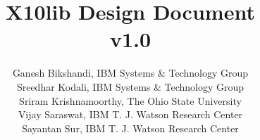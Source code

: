 \documentclass{article}
\def\Xtenlib{{\sf X10lib}}
\begin{document}
\title{\Xtenlib{} Design Document \\ v1.0}
\author{Ganesh Bikshandi, IBM Systems \& Technology Group\\
Sreedhar Kodali, IBM Systems \& Technology Group\\
Sriram Krishnamoorthy, The Ohio State University\\
Vijay Saraswat, IBM T. J. Watson Research Center\\
Sayantan Sur, IBM T. J. Watson Research Center}

\maketitle

\thispagestyle{fancy}







\end{document}
